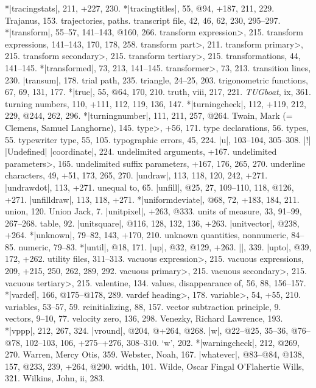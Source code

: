 *|tracingstats|, 211, +227, 230.
*|tracingtitles|, 55, @94, +187, 211, 229.
Trajanus, 153.
trajectories, \see paths.
transcript file, 42, 46, 62, 230, 295--297.
*|transform|, 55--57, 141--143, @160, 266.
\<transform expression>, 215.
transform expressions, 141--143, 170, 178, 258.
\<transform part>, 211.
\<transform primary>, 215.
\<transform secondary>, 215.
\<transform tertiary>, 215.
transformations, 44, 141--145.
*|transformed|, 73, 213, 141--145.
\<transformer>, 73, 213.
transition lines, 230.
|transum|, 178.
trial path, 235.
triangle, 24--25, 203.
trigonometric functions, 67, 69, 131, 177.
*|true|, 55, @64, 170, 210.
truth, viii, 217, 221.
{\sl TUGboat}, ix, 361.
turning numbers, 110, +111, 112, 119, 136, 147.
*|turningcheck|, 112, +119, 212, 229, @244, 262, 296.
*|turningnumber|, 111, 211, 257, @264.
Twain, Mark (= Clemens, Samuel Langhorne), 145.
\<type>, +56, 171.
type declarations, 56.
types, 55.
typewriter type, 55, 105.
typographic errors, 45, 224.
\newletter
|u|, 103--104, 305--308.
|!| |Undefined| |coordinate|, 224.
undelimited arguments, +167.
\<undelimited parameters>, 165.
undelimited suffix parameters, +167, 176, 265, 270.
underline characters, 49, +51, 173, 265, 270.
|undraw|, 113, 118, 120, 242, +271.
|undrawdot|, 113, +271.
unequal to, 65.
|unfill|, @25, 27, 109--110, 118, @126, +271.
|unfilldraw|, 113, 118, +271.
*|uniformdeviate|, @68, 72, +183, 184, 211.
union, 120.
Union Jack, 7.
|unitpixel|, +263, @333.
units of measure, 33, 91--99, 267--268.
\sub table, 92.
|unitsquare|, @116, 128, 132, 136, +263.
|unitvector|, @238, +264.
*|unknown|, 79--82, 143, +170, 210.
unknown quantities, nonnumeric, 84--85.
\sub numeric, 79--83.
*|until|, @18, 171.
|up|, @32, @129, +263.
|\uppers|, 339.
|upto|, @39, 172, +262.
utility files, 311--313.
\newletter
\<vacuous expression>, 215.
vacuous expressions, 209, +215, 250, 262, 289, 292.
\<vacuous primary>, 215.
\<vacuous secondary>, 215.
\<vacuous tertiary>, 215.
valentine, 134.
values, disappearance of, 56, 88, 156--157.
*|vardef|, 166, @175--@178, 289.
\<vardef heading>, 178.
\<variable>, 54, +55, 210.
variables, 53--57, 59.
\sub reinitializing, 88, 157.
vector subtraction principle, 9.
vectors, 9--10, 77.
velocity zero, 136, 298.
Venezky, Richard Lawrence, 193.
*|vppp|, 212, 267, 324.
|vround|, @204, @+264, @268.
\newletter
|w|, @22--@25, 35--36, @76--@78, 102--103, 106, +275--+276, 308--310.
`w', 202.
*|warningcheck|, 212, @269, 270.
Warren, Mercy Otis, 359.
Webster, Noah, 167.
|whatever|, @83--@84, @138, 157, @233, 239, +264, @290.
width, 101.
Wilde, Oscar Fingal O'Flahertie Wills, 321.
Wilkins, John, ii, 283.
